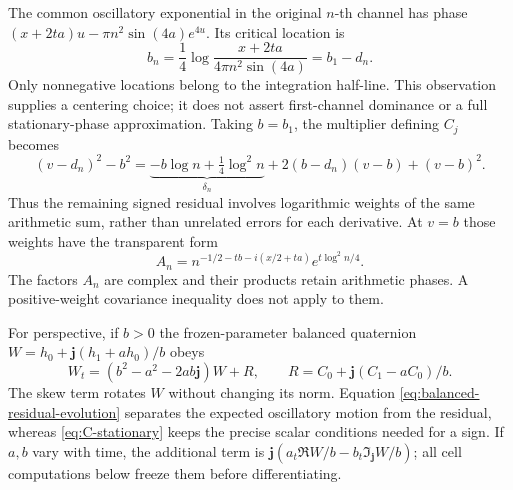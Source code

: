 \documentclass[11pt]{article}
\numberwithin{equation}{section}
\theoremstyle{definition}
\theoremstyle{remark}
\newcommand{\jj}{\mathbf j}
\begin{document}
The common oscillatory exponential in the original $n$-th channel has
phase $(x+2ta)u-\pi n^2\sin(4a)e^{4u}$. Its critical location is
\begin{equation}
 b_n=\frac14\log\frac{x+2ta}{4\pi n^2\sin(4a)}
     =b_1-d_n.
 \label{eq:channel-centers}
\end{equation}
Only nonnegative locations belong to the integration half-line.
This observation supplies a centering choice; it does not assert
first-channel dominance or a full stationary-phase approximation.
Taking $b=b_1$, the multiplier defining $C_j$ becomes
\begin{equation}
 (v-d_n)^2-b^2
 =\underbrace{-b\log n+\tfrac14\log^2n}_{\delta_n}
       +2(b-d_n)(v-b)+(v-b)^2.
 \label{eq:logarithmic-residual}
\end{equation}
Thus the remaining signed residual involves logarithmic weights of the
same arithmetic sum, rather than unrelated errors for each derivative.
At $v=b$ those weights have the transparent form
\begin{equation}
 A_n=n^{-1/2-tb-i(x/2+ta)}e^{t\log^2n/4}.
 \label{eq:saddle-weights}
\end{equation}
The factors $A_n$ are complex and their products retain arithmetic
phases. A positive-weight covariance inequality does not apply to them.

For perspective, if $b>0$ the frozen-parameter balanced quaternion
$W=h_0+\jj(h_1+ah_0)/b$ obeys
\begin{equation}
 W_t=(b^2-a^2-2ab\jj)W+R,\qquad
 R=C_0+\jj(C_1-aC_0)/b.
 \label{eq:balanced-residual-evolution}
\end{equation}
The skew term rotates $W$ without changing its norm. Equation
\eqref{eq:balanced-residual-evolution} separates the expected oscillatory
motion from the residual, whereas \eqref{eq:C-stationary} keeps the
precise scalar conditions needed for a sign. If $a,b$ vary with time,
the additional term is
$\jj(a_t\Re W/b-b_t\Im_{\jj}W/b)$; all cell computations below freeze
them before differentiating.
\end{document}
